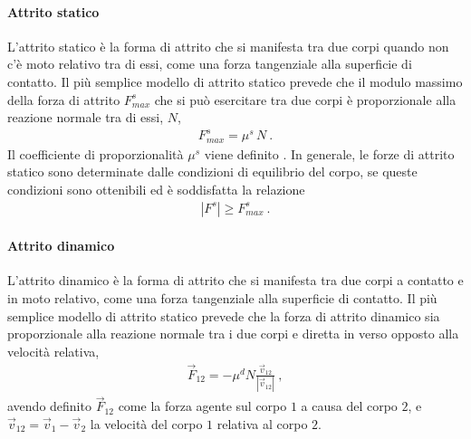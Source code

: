 \documentclass[letterpaper,10pt,italian]{jupyterBook}
\begin{document}
\paragraph{Attrito statico}
\label{\detokenize{ch/mechanics/actions-examples:attrito-statico}}
\sphinxAtStartPar
L’attrito statico è la forma di attrito che si manifesta tra due corpi quando non c’è moto relativo tra di essi, come una forza tangenziale alla superficie di contatto. Il più semplice modello di attrito statico prevede che il modulo massimo della forza di attrito \(F^s_{max}\) che si può esercitare tra due corpi è proporzionale alla reazione normale tra di essi, \(N\),
\begin{equation*}
\begin{split}F^s_{max} = \mu^s \, N \ .\end{split}
\end{equation*}
\sphinxAtStartPar
Il coefficiente di proporzionalità \(\mu^s\) viene definito . In generale, le forze di attrito statico sono determinate dalle condizioni di equilibrio del corpo, se queste condizioni sono ottenibili ed  è soddisfatta la relazione
\begin{equation*}
\begin{split}|F^s| \ge F^s_{max} \ .\end{split}
\end{equation*}

\paragraph{Attrito dinamico}
\label{\detokenize{ch/mechanics/actions-examples:attrito-dinamico}}
\sphinxAtStartPar
L’attrito dinamico è la forma di attrito che si manifesta tra due corpi a contatto e in moto relativo, come una forza tangenziale alla superficie di contatto. Il più semplice modello di attrito statico prevede che la forza di attrito dinamico sia proporzionale alla reazione normale tra i due corpi e diretta in verso opposto alla velocità relativa,
\begin{equation*}
\begin{split}\vec{F}_{12} = - \mu^d N \frac{\vec{v}_{12}}{|\vec{v}_{12}|} \ ,\end{split}
\end{equation*}
\sphinxAtStartPar
avendo definito \(\vec{F}_{12}\) come la forza agente sul corpo \(1\) a causa del corpo \(2\), e \(\vec{v}_{12} = \vec{v}_1 - \vec{v}_2\) la velocità del corpo \(1\) relativa al corpo \(2\).
\end{document}
